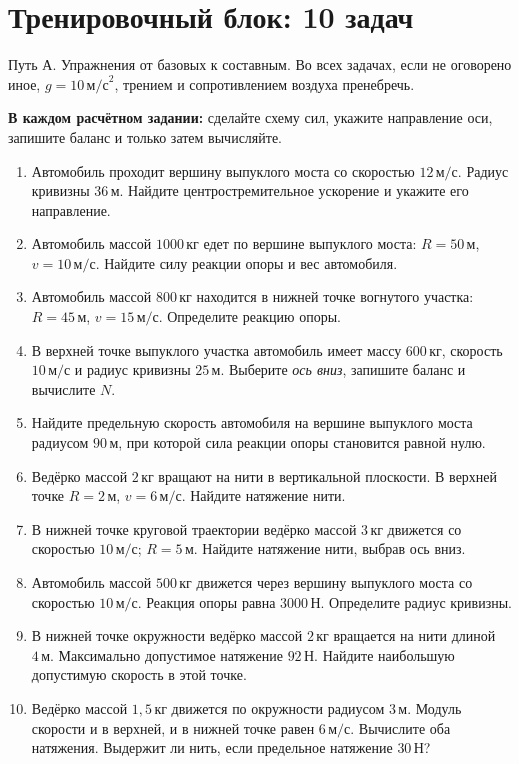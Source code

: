 \documentclass[a4paper,11pt]{article}
\begin{document}
\section*{Тренировочный блок: 10 задач}
\textcolor{softgray}{Путь А. Упражнения от базовых к составным. Во всех задачах, если не оговорено иное, $g=10\,\text{м/с}^2$, трением и сопротивлением воздуха пренебречь.}\par
\textbf{В каждом расчётном задании:} сделайте схему сил, укажите направление оси, запишите баланс и только затем вычисляйте.
\begin{enumerate}[label=\textcolor{darkaccent}{\textbf{\arabic*.}},leftmargin=21pt,itemsep=10pt]
\item Автомобиль проходит вершину выпуклого моста со скоростью $12\,\text{м/с}$. Радиус кривизны $36\,\text{м}$. Найдите центростремительное ускорение и укажите его направление.
\item Автомобиль массой $1000\,\text{кг}$ едет по вершине выпуклого моста: $R=50\,\text{м}$, $v=10\,\text{м/с}$. Найдите силу реакции опоры и вес автомобиля.
\item Автомобиль массой $800\,\text{кг}$ находится в нижней точке вогнутого участка: $R=45\,\text{м}$, $v=15\,\text{м/с}$. Определите реакцию опоры.
\item В верхней точке выпуклого участка автомобиль имеет массу $600\,\text{кг}$, скорость $10\,\text{м/с}$ и радиус кривизны $25\,\text{м}$. Выберите \emph{ось вниз}, запишите баланс и вычислите $N$.
\item Найдите предельную скорость автомобиля на вершине выпуклого моста радиусом $90\,\text{м}$, при которой сила реакции опоры становится равной нулю.
\item Ведёрко массой $2\,\text{кг}$ вращают на нити в вертикальной плоскости. В верхней точке $R=2\,\text{м}$, $v=6\,\text{м/с}$. Найдите натяжение нити.
\item В нижней точке круговой траектории ведёрко массой $3\,\text{кг}$ движется со скоростью $10\,\text{м/с}$; $R=5\,\text{м}$. Найдите натяжение нити, выбрав ось вниз.
\item Автомобиль массой $500\,\text{кг}$ движется через вершину выпуклого моста со скоростью $10\,\text{м/с}$. Реакция опоры равна $3000\,\text{Н}$. Определите радиус кривизны.
\item В нижней точке окружности ведёрко массой $2\,\text{кг}$ вращается на нити длиной $4\,\text{м}$. Максимально допустимое натяжение $92\,\text{Н}$. Найдите наибольшую допустимую скорость в этой точке.
\item Ведёрко массой $1{,}5\,\text{кг}$ движется по окружности радиусом $3\,\text{м}$. Модуль скорости и в верхней, и в нижней точке равен $6\,\text{м/с}$. Вычислите оба натяжения. Выдержит ли нить, если предельное натяжение $30\,\text{Н}$?
\end{enumerate}
\clearpage
\end{document}
